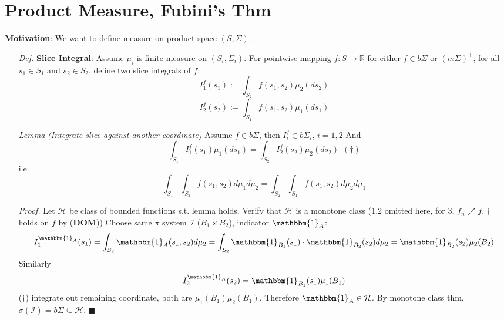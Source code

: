 \documentclass[a4paper,12pt,twoside]{book}
\begin{document}
\section{Product Measure, Fubini's Thm}
\textbf{Motivation}: We want to define measure on product space $(S, \Sigma)$.

\begin{itemize}
	\item[\textit{Def.}] \textbf{Slice Integral}: Assume $\mu_i$ is finite measure on $(S_i, \Sigma_i)$. For pointwise mapping $f: S\to \mathbb{R}$ for either $f \in b\Sigma$ or $(m\Sigma)^+$, for all $s_1\in S_1$ and $s_2 \in S_2$, define two slice integrals of $f$:
	\begin{equation}
		I_1^f(s_1):=\int_{S_2}f(s_1, s_2)\mu_2(ds_2)
	\end{equation}
	\begin{equation}
		I_2^f(s_2):=\int_{S_1}f(s_1, s_2)\mu_1(ds_1)
	\end{equation}

	\item[\textit{Lemma}] \textit{(Integrate slice against another coordinate)} Assume $f\in b\Sigma$, then $I^f_i \in b\Sigma_i$, $i=1,2$ And
	\begin{equation}
		\int_{S_1} I_1^f(s_1)\mu_1(ds_1)=\int_{S_2} I_2^f(s_2)\mu_2(ds_2)~~(\dagger)
	\end{equation}
	i.e.
	\begin{equation}
		\int_{S_1}\int_{S_2}f(s_1, s_2)d\mu_1 d\mu_2 = \int_{S_2}\int_{S_1}f(s_1, s_2)d\mu_2 d\mu_1
	\end{equation}

	\item[\textit{Proof.}] Let $\mathcal{H}$ be class of bounded functions s.t. lemma holds. Verify that $\mathcal{H}$ is a monotone class (1,2 omitted here, for 3, $f_n \nearrow f$, $\dagger$ holds on $f$ by (\textbf{DOM})) \newline
	Choose same $\pi$ system $\mathcal{I}$ ($B_1 \times B_2$), indicator $\mathbbm{1}_{A}$:
	\begin{equation}
		I_1^{\mathbbm{1}_{A}}(s_1)=\int_{S_2} \mathbbm{1}_{A}(s_1, s_2) d\mu_2=\int_{S_2} \mathbbm{1}_{B_1}(s_1)\cdot \mathbbm{1}_{B_2}(s_2) d\mu_2= \mathbbm{1}_{B_2}(s_2)\mu_2(B_2)
	\end{equation}
	Similarly
	\begin{equation}
		I_2^{\mathbbm{1}_{A}}(s_2)=\mathbbm{1}_{B_1}(s_1)\mu_1(B_1)
	\end{equation}
	($\dagger$) integrate out remaining coordinate, both are $\mu_1(B_1)\mu_2(B_1)$. Therefore $\mathbbm{1}_{A}\in \mathcal{H}$. By monotone class thm, $\sigma(\mathcal{I})=b\Sigma \subseteq \mathcal{H}$. $\blacksquare$


\end{itemize}
\end{document}
